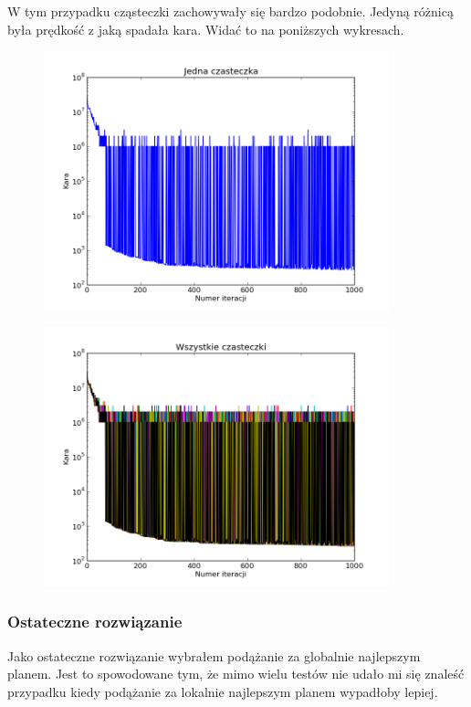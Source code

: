 \par W tym przypadku cząsteczki zachowywały się bardzo podobnie. Jedyną różnicą była prędkość z jaką spadała kara. Widać to na poniższych wykresach. 
\begin{figure}[H]
\includegraphics[width=10cm]{img/globalbest_particle.png}
\centering
\end{figure}
\begin{figure}[H]
\includegraphics[width=10cm]{img/globalbest_particle_all.png}
\centering
\end{figure}
\subsubsection{Ostateczne rozwiązanie}
\par Jako ostateczne rozwiązanie wybrałem podążanie za globalnie najlepszym planem. Jest to spowodowane tym, że mimo wielu testów nie udało mi się znaleść przypadku kiedy podążanie za lokalnie najlepszym planem wypadłoby lepiej. 
